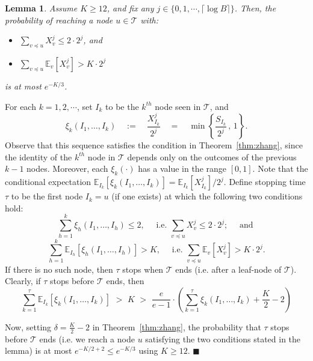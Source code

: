 \documentclass[11pt,letterpaper]{article}
\newtheorem{lemma}[theorem]{Lemma}
\numberwithin{algorithm}{section}
\newenvironment{proof}{

\noindent{\bf Proof:}}
{\hfill$\blacksquare$


}
\newcommand{\T}{\ensuremath{\mathcal{T}}\xspace}
\newcommand{\E}{\mathbb{E}}
\begin{document}
\begin{lemma}\label{lem:corr-prob}
Assume $K\ge 12$, and fix any $j\in\{0,1,\cdots,\lceil \log B\rceil\}$. Then, the probability of reaching a node $u\in \T$ with:\begin{itemize}
\item $\sum_{v\preceq u} X^j_v \le 2\cdot 2^j$, and
\item $\sum_{v\preceq u} \E_v\left[ X^j_v \right] > K\cdot 2^j$
\end{itemize}
is at most $e^{-K/3}$.
\end{lemma}
\begin{proof}
For each $k=1,2,\cdots$, set $I_k$ to be the $k^{th}$ node seen in \T, and
$$\xi_k(I_1,\ldots,I_k) \quad := \quad \frac{X^j_{I_k}}{2^j} \quad = \quad \min\left\{ \frac{S_{I_k}}{2^{j}}\, , \, 1\right\}.$$
Observe that this sequence satisfies the condition in Theorem~\ref{thm:zhang}, since the identity of the $k^{th}$ node in \T depends only on the outcomes of the previous $k-1$ nodes. Moreover, each $\xi_k(\cdot)$ has a value in the range $[0,1]$. Note that the conditional expectation $\E_{I_k}[\xi_k(I_1,\ldots,I_k)] = \E_{I_k}\left[X^j_{I_k}\right]/2^j$. Define stopping time $\tau$ to be the first node $I_k=u$ (if one exists) at which the following two conditions hold:
$$\sum_{h=1}^k \xi_h(I_1,\ldots,I_h) \le 2, \quad \mbox{ i.e. } \sum_{v\preceq u} X^j_v \le 2\cdot 2^j; \quad \mbox{ and }$$
$$\sum_{h=1}^k \E_{I_h}\left[\xi_h(I_1,\ldots,I_h)\right] > K, \quad \mbox{ i.e. } \sum_{v\preceq u} \E_v\left[ X^j_v \right] > K\cdot 2^j.$$
If there is no such node, then $\tau$ stops when \T ends (i.e. after a leaf-node of \T). Clearly, if $\tau$ stops before \T ends, then
$$ \sum_{k=1}^\tau \E_{I_k}[\xi_k(I_1,\ldots,I_k)] \,\, > \,\, K \,\, > \,\, \frac{e}{e-1}\cdot \left( \sum_{k=1}^\tau
\xi_k(I_1,\ldots,I_k) +\frac{K}{2}-2\right)$$

Now, setting $\delta=\frac{K}{2}-2$ in Theorem~\ref{thm:zhang}, the probability that $\tau$ stops before \T ends (i.e. we reach a node $u$ satisfying the two conditions stated in the lemma) is at most  $e^{-K/2+2}\le e^{-K/3}$  using $K\ge 12$. \end{proof}
\end{document}
